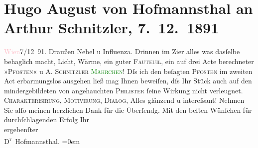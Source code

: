 

               \section[Hugo August von Hofmannsthal an Arthur Schnitzler, 7. 12. 1891]{ Hugo August von Hofmannsthal an Arthur Schnitzler,
                    7. 12. 1891}\nopagebreak{}\rehead{ }\normalsize\beginnumbering{} \toendnotes[C]{\smallbreak\pagebreak[2]} 
\toendnotes[C]{\smallbreak}\pstart
           \raggedleft{}{\pb}\textcolor{pink}{Wien}{}\ledrightnote{\textcolor{pink}{Wien}}{ }7/12 91.\pend
           \pstart
           Draußen Nebel u Influenza. Drinnen im Zi{\geminationm}er alles
                    was dasſelbe behaglich macht, Licht, Wärme, ein guter \textsc{Fauteuil}, ein auf drei Acte berechneter »\textsc{Pfosten}« u \textsc{A. Schnitzler \textcolor{green}{Mährchen}{}\ledrightnote{\textcolor{green}{Das Märchen. Schauspiel in drei Aufzügen}}}! Dſs ich den beſagten \textsc{Pfosten} im zweiten Act erbarmungslos ausgehen ließ mag
                    Ihnen beweiſen, dſs Ihr Stück auch auf den mindergebildeten von \label{K_L00050_1v}\label{K_L00050_1h}
                    angehauchten \textsc{Philister} ſeine {\pb}Wirkung nicht verleugnet. \textsc{Charakterisirung}, \textsc{Motivirung}, \textsc{Dialog}, Alles glänzend u intereſsant!\pend
           \pstart
           Nehmen Sie alſo meinen herzlichen Dank für die Überſendg.\pend
           \pstart
           Mit den beſten Wünſchen für durchſchlagenden Erfolg
                            Ihr{\\[\baselineskip]}ergebenſter{\\[\baselineskip]}\spacefill\mbox{D\textsuperscript{r}
                        Hofmannsthal.}\pend
           \leftskip=0em{}\endnumbering{}  
      